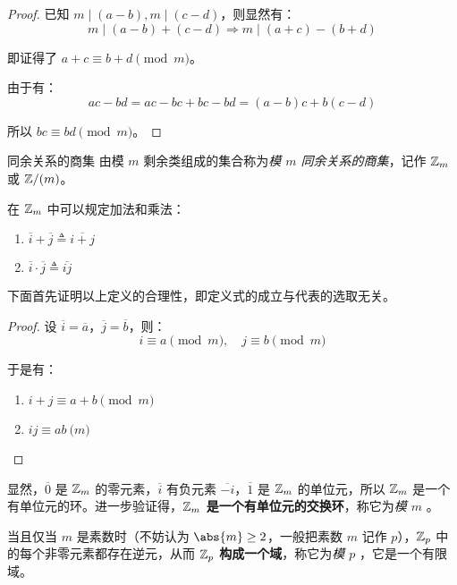 \begin{proof}
	已知 $m \mid (a - b), m \mid (c - d)$，则显然有：
	$$
	m \mid (a - b) + (c - d) \Longrightarrow m \mid (a + c) - (b + d)
	$$

	即证得了 $a + c \equiv b + d \pmod{m}$。

	由于有：
	$$
	ac - bd = ac - bc + bc - bd = (a - b) c + b (c - d)
	$$

	所以 $bc \equiv bd \pmod{m}$。
\end{proof}

\begin{definition}{同余关系的商集}
	由模 $m$ 剩余类组成的集合称为\emph{模 $m$ 同余关系的商集}，记作 $\mathbb Z_m$ 或 $\mathbb Z / (m)$。
\end{definition}

在 $\mathbb Z_m$ 中可以规定加法和乘法：
\begin{enumerate}
	\item $\overline i + \overline j \triangleq \overline{i + j}$
	\item $\overline i \cdot \overline j \triangleq \overline {ij}$
\end{enumerate}

下面首先证明以上定义的合理性，即定义式的成立与代表的选取无关。

\begin{proof}
	设 $\overline i = \overline a$，$\overline j = \overline b$，则：
	$$
	i \equiv a \pmod{m}, \quad j \equiv b \pmod{m}
	$$

	于是有：
	\begin{enumerate}
		\item $i + j \equiv a + b \pmod{m}$
		\item $ij \equiv ab \pod{m}$
	\end{enumerate}
\end{proof}

显然，$\overline 0$ 是 $\mathbb Z_m$ 的零元素，$\overline i$ 有负元素 $\overline{-i}$，$\overline 1$ 是 $\mathbb Z_m$ 的单位元，所以 $\mathbb Z_m$ 是一个有单位元的环。进一步验证得，\textbf{$\mathbb Z_m$ 是一个有单位元的交换环}，称它为\emph{模 $m$ }。

当且仅当 $m$ 是素数时（不妨认为 $\abs{m} \ge 2$，一般把素数 $m$ 记作 $p$），$\mathbb Z_p$ 中的每个非零元素都存在逆元，从而 \textbf{$\mathbb Z_p$ 构成一个域}，称它为\emph{模 $p$ }，它是一个有限域。

